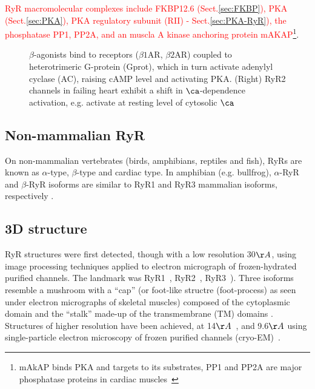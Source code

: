 \begin{framed}

  \textcolor{red}{RyR macromolecular complexes include FKBP12.6
  (Sect.\ref{sec:FKBP}), PKA (Sect.\ref{sec:PKA}), PKA regulatory subunit (RII)
  - Sect.\ref{sec:PKA-RyR}), the phosphatase PP1, PP2A, and an muscla A kinase
  anchoring protein mAKAP}\footnote{mAkAP
    binds PKA and targets to its substrates, PP1 and PP2A are major phosphatase
    proteins in cardiac muscles~\citep{MacDougall1991}}.
\end{framed}


\begin{figure}[hbt]
  \caption{$\beta$-agonists bind to receptors ($\beta 1$AR, $\beta
    2$AR) coupled to heterotrimeric G-protein (Gprot), which in turn
    activate adenylyl cyclase (AC), raising cAMP level and activating
    PKA. (Right) RyR2 channels in failing heart exhibit a shift in
    $\ca$-dependence activation, e.g. activate at resting level of
    cytosolic $\ca$~\citep{marx2000}}
  \label{fig:PKA_phosphorylation}
\end{figure}


\subsection{Non-mammalian RyR}

On non-mammalian vertebrates (birds, amphibians, reptiles and fish), RyRs are
known as $\alpha$-type, $\beta$-type and cardiac type. In amphibian (e.g.
bullfrog), $\alpha$-RyR and $\beta$-RyR isoforms are similar to RyR1 and RyR3
mammalian isoforms, respectively \citep{ogawa1994, ottini1996}. 



\subsection{3D structure}
\label{sec:RyR_3D}

RyR structures were first detected, though with a low resolution 30$\AA$, using
image processing techniques applied to electron micrograph of frozen-hydrated
purified channels. The landmark was RyR1~\citep{Radermacher1994},
RyR2~\citep{Sharma1998}, RyR3~\citep{Jeyakumar1998a}). Three isoforms resemble a
mushroom with a ``cap'' (or foot-like structre (foot-process) as seen under
electron micrographs of skeletal muscles) composed of the cytoplasmic domain and
the ``stalk'' made-up of the transmembrane (TM) domains
\citep{franzini_armstrong1994}.
Structures of higher resolution have been achieved, at
14$\AA$~\citep{Serysheva2004,Serysheva2005}, and 9.6$\AA$ using single-particle
electron microscopy of frozen purified channels
(cryo-EM)~\citep{Ludtke2005,samso2005}.

